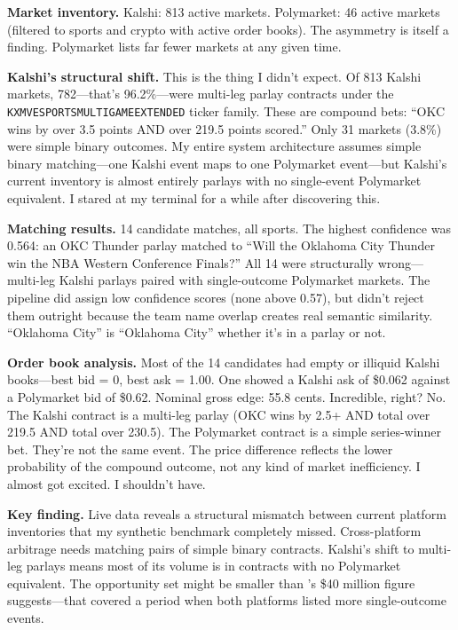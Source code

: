 \documentclass[11pt]{article}
\theoremstyle{definition}
\theoremstyle{remark}
\begin{document}
\textbf{Market inventory.} Kalshi: 813 active markets. Polymarket: 46 active markets (filtered to sports and crypto with active order books). The asymmetry is itself a finding. Polymarket lists far fewer markets at any given time.

\textbf{Kalshi's structural shift.} This is the thing I didn't expect. Of 813 Kalshi markets, 782---that's 96.2\%---were multi-leg parlay contracts under the \texttt{KXMVESPORTSMULTIGAMEEXTENDED} ticker family. These are compound bets: ``OKC wins by over 3.5 points AND over 219.5 points scored.'' Only 31 markets (3.8\%) were simple binary outcomes. My entire system architecture assumes simple binary matching---one Kalshi event maps to one Polymarket event---but Kalshi's current inventory is almost entirely parlays with no single-event Polymarket equivalent. I stared at my terminal for a while after discovering this.

\textbf{Matching results.} 14 candidate matches, all sports. The highest confidence was 0.564: an OKC Thunder parlay matched to ``Will the Oklahoma City Thunder win the NBA Western Conference Finals?'' All 14 were structurally wrong---multi-leg Kalshi parlays paired with single-outcome Polymarket markets. The pipeline did assign low confidence scores (none above 0.57), but didn't reject them outright because the team name overlap creates real semantic similarity. ``Oklahoma City'' is ``Oklahoma City'' whether it's in a parlay or not.

\textbf{Order book analysis.} Most of the 14 candidates had empty or illiquid Kalshi books---best bid = 0, best ask = 1.00. One showed a Kalshi ask of \$0.062 against a Polymarket bid of \$0.62. Nominal gross edge: 55.8 cents. Incredible, right? No. The Kalshi contract is a multi-leg parlay (OKC wins by 2.5+ AND total over 219.5 AND total over 230.5). The Polymarket contract is a simple series-winner bet. They're not the same event. The price difference reflects the lower probability of the compound outcome, not any kind of market inefficiency. I almost got excited. I shouldn't have.

\textbf{Key finding.} Live data reveals a structural mismatch between current platform inventories that my synthetic benchmark completely missed. Cross-platform arbitrage needs matching pairs of simple binary contracts. Kalshi's shift to multi-leg parlays means most of its volume is in contracts with no Polymarket equivalent. The opportunity set might be smaller than \citet{saguillo2025arbitrage}'s \$40 million figure suggests---that covered a period when both platforms listed more single-outcome events.
\end{document}
